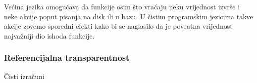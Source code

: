 Većina jezika omogućava da funkcije osim što vraćaju neku vrijednost izvrše i neke akcije poput pisanja na disk ili u bazu. U čistim programskim jezicima takve akcije zovemo sporedni efekti  kako bi se naglasilo da je povratna vrijednost najvažniji dio ishoda funkcije.\cite{fp_purity}

\subsubsection{Referencijalna transparentnost}

Čisti izračuni 